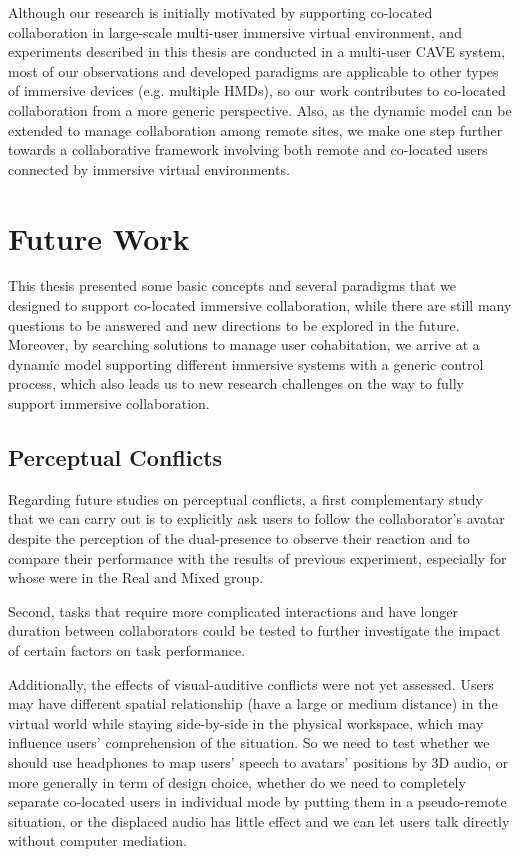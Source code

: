 Although our research is initially motivated by supporting co-located collaboration in large-scale multi-user immersive virtual environment, and experiments described in this thesis are conducted in a multi-user CAVE system, most of our observations and developed paradigms are applicable to other types of immersive devices (e.g. multiple HMDs), so our work contributes to co-located collaboration from a more generic perspective. Also, as the dynamic model can be extended to manage collaboration among remote sites, we make one step further towards a collaborative framework involving both remote and co-located users connected by immersive virtual environments.

\section*{Future Work}

This thesis presented some basic concepts and several paradigms that we designed to support co-located immersive collaboration, while there are still many questions to be answered and new directions to be explored in the future. Moreover, by searching solutions to manage user cohabitation, we arrive at a dynamic model supporting different immersive systems with a generic control process, which also leads us to new research challenges on the way to fully support immersive collaboration.

\subsection*{Perceptual Conflicts}
Regarding future studies on perceptual conflicts, a first complementary study that we can carry out is to explicitly ask users to follow the collaborator's avatar despite the perception of the dual-presence to observe their reaction and to compare their performance with the results of previous experiment, especially for whose were in the Real and Mixed group.

Second, tasks that require more complicated interactions and have longer duration between collaborators could be tested to further investigate the impact of certain factors on task performance.

Additionally, the effects of visual-auditive conflicts were not yet assessed. Users may have different spatial relationship (have a large or medium distance) in the virtual world while staying side-by-side in the physical workspace, which may influence users' comprehension of the situation. So we need to test whether we should use headphones to map users' speech to avatars' positions by 3D audio, or more generally in term of design choice, whether do we need to completely separate co-located users in individual mode by putting them in a pseudo-remote situation, or the displaced audio has little effect and we can let users talk directly without computer mediation.

